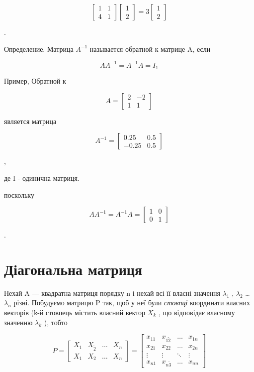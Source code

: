 \documentclass[
  ukrainian,
]{article}
\begin{document}
\[
\begin{bmatrix} 1 & 1 \\ 4 & 1 \end{bmatrix}
\begin{bmatrix} 1 \\ 2 \end{bmatrix}
= 3
\begin{bmatrix} 1 \\ 2 \end{bmatrix}
\]

.

Определение. Матрица \(A^{-1}\) называется обратной к матрице A, если

\[
AA^{-1} = A^{-1}A = I_1
\]

Пример, Обратной к

\[
A =
\begin{bmatrix} 2 & -2 \\ 1 & 1 \end{bmatrix}
\]

является матрица

\[
A^{-1} =
\begin{bmatrix} 0.25 & 0.5 \\ -0.25 & 0.5 \end{bmatrix}
\]

,

де I - одинична матриця.

поскольку

\[
AA^{-1} = A^{-1}A =
\begin{bmatrix} 1 & 0 \\ 0 & 1 \end{bmatrix}
\]

.

\section{Діагональна
матриця}\label{ux434ux456ux430ux433ux43eux43dux430ux43bux44cux43dux430-ux43cux430ux442ux440ux438ux446ux44f}

Нехай A --- квадратна матриця порядку n і нехай всі її власні значення
\(\lambda_1\) , \(\lambda_2\) \ldots{} \(\lambda_n\) різні. Побудуємо
матрицю P так, щоб у неї були \emph{стовпці} координати власних векторів
(k-й стовпець містить власний вектор \(X_k\) , що відповідає власному
значенню \(\lambda_k\) ), тобто

\[
P =
\begin{bmatrix} X_1 & X_{\tilde{2}} & \dots & X_n \\ X_{1} & X_{2} & \dots & X_n \end{bmatrix}
=
\begin{bmatrix} x_{11} & x_{1\tilde{2}} & \dots & x_{1n} \\ x_{21} & x_{22} & \dots & x_{2n} \\ \vdots & \vdots & \ddots & \vdots \\ x_{n1} & x_{n\tilde{3}} & \dots & x_{nn} \end{bmatrix}
\]
\end{document}
